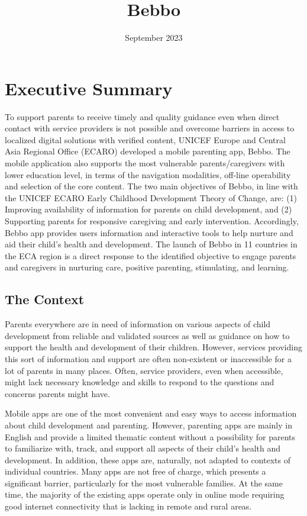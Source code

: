 \message{ !name(bebbo.tex)}\documentclass{article}
\title{Bebbo}
\date{September 2023}
\begin{document}


\tableofcontents


\section{Executive Summary}

To support parents to receive timely and quality guidance even when direct contact with service  providers is not possible and overcome barriers in access to localized digital solutions with verified  content, UNICEF Europe and Central Asia Regional Office (ECARO) developed a mobile parenting app,  Bebbo. The mobile application also supports the most vulnerable parents/caregivers with lower  education level, in terms of the navigation modalities, off-line operability and selection of the core  content. The two main objectives of Bebbo, in line with the UNICEF ECARO Early Childhood  Development Theory of Change, are: (1) Improving availability of information for parents on child  development, and (2) Supporting parents for responsive caregiving and early intervention.  Accordingly, Bebbo app provides users information and interactive tools to help nurture and aid their  child’s health and development. The launch of Bebbo in 11 countries in the ECA region is a direct  response to the identified objective to engage parents and caregivers in nurturing care, positive  parenting, stimulating, and learning.

\subsection*{The Context}
Parents everywhere are in need of information on various aspects of child development from reliable  and validated sources as well as guidance on how to support the health and development of their  children. However, services providing this sort of information and support are often non-existent or  inaccessible for a lot of parents in many places. Often, service providers, even when accessible, might  lack necessary knowledge and skills to respond to the questions and concerns parents might have.

Mobile apps are one of the most convenient and easy ways to access information about child  development and parenting. However, parenting apps are mainly in English and provide a limited  thematic content without a possibility for parents to familiarize with, track, and support all aspects of  their child’s health and development. In addition, these apps are, naturally, not adapted to contexts of  individual countries. Many apps are not free of charge, which presents a significant barrier, particularly  for the most vulnerable families. At the same time, the majority of the existing apps operate only in  online mode requiring good internet connectivity that is lacking in remote and rural areas.
\end{document}
